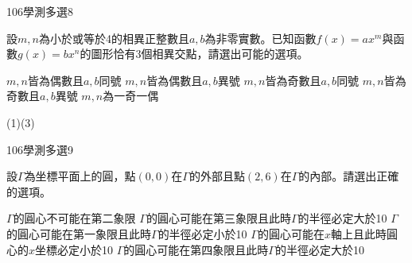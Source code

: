 \begin{QUESTIONS}
    \begin{QUESTION}
        \begin{ExamInfo}{106}{學測}{多選}{8}
        \end{ExamInfo}
        \begin{ExamAnsRateInfo}{24}{35}{20}{17}
        \end{ExamAnsRateInfo}
        \begin{QBODY}
		    設$m,n$為小於或等於4的相異正整數且$a,b$為非零實數。已知函數$f(x)=a{{x}^{m}}$與函數$g(x)=b{{x}^{n}}$的圖形恰有3個相異交點，請選出可能的選項。
			\begin{QOPS}
			\QOP $m,n$皆為偶數且$a,b$同號 
			\QOP $m,n$皆為偶數且$a,b$異號
			\QOP $m,n$皆為奇數且$a,b$同號
			\QOP $m,n$皆為奇數且$a,b$異號
			\QOP $m,n$為一奇一偶
			\end{QOPS}
        \end{QBODY}
        \begin{QFROMS}
        \end{QFROMS}
        \begin{QTAGS}\end{QTAGS}
        \begin{QANS}
            (1)(3)
        \end{QANS}
        \begin{QSOLLIST}
        \end{QSOLLIST}
        \begin{QEMPTYSPACE}
        \end{QEMPTYSPACE}
    \end{QUESTION}
    \begin{QUESTION}
        \begin{ExamInfo}{106}{學測}{多選}{9}
        \end{ExamInfo}
        \begin{ExamAnsRateInfo}{34}{57}{30}{15}
        \end{ExamAnsRateInfo}
        \begin{QBODY}
			設$\Gamma $為坐標平面上的圓，點$(0,0)$在$\Gamma $的外部且點$(2,6)$在$\Gamma $的內部。請選出正確的選項。
			\begin{QOPS}
			\QOP $\Gamma $的圓心不可能在第二象限
			\QOP $\Gamma $的圓心可能在第三象限且此時$\Gamma $的半徑必定大於10
			\QOP $\Gamma $的圓心可能在第一象限且此時$\Gamma $的半徑必定小於10
			\QOP $\Gamma $的圓心可能在$x$軸上且此時圓心的$x$坐標必定小於10
			\QOP $\Gamma $的圓心可能在第四象限且此時$\Gamma $的半徑必定大於10
			\end{QOPS}

\end{QBODY}
\end{QUESTION}
\end{QUESTIONS}
